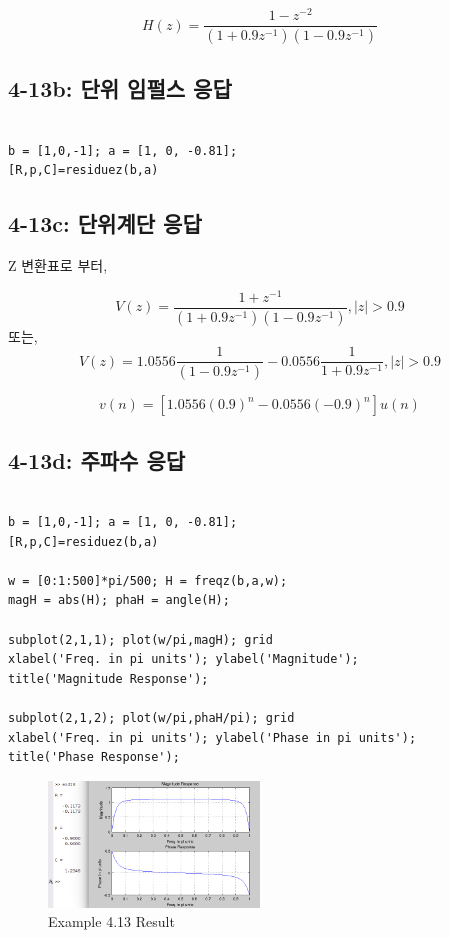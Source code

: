 \documentclass[11pt
  , a4paper
  , article
  , oneside
]{memoir}
\begin{document}
\begin {equation}
H(z) = \frac{1-z^{-2}}{(1+0.9z^{-1})(1-0.9z^{-1})}
\end {equation}

\subsection{4-13b: 단위 임펄스 응답}
\begin{lstlisting}[style=termstyle]
%Example 4.13

b = [1,0,-1]; a = [1, 0, -0.81];
[R,p,C]=residuez(b,a)

\end{lstlisting}


\subsection{4-13c: 단위계단 응답}
Z 변환표로 부터,

\begin {equation}
V(z) = \frac{1+z^{-1}}{(1+0.9z^{-1})(1-0.9z^{-1})}, |z| > 0.9
\end {equation}
또는,
\begin {equation}
V(z) = 1.0556\frac{1}{(1-0.9z^{-1})} - 0.0556\frac{1}{1+0.9z^{-1}}, |z| > 0.9
\end {equation}

\begin {equation}
v(n) = [1.0556(0.9)^n - 0.0556(-0.9)^n]u(n)
\end {equation}

\subsection{4-13d: 주파수 응답}
\begin{lstlisting}[style=termstyle]
%Example 4.13

b = [1,0,-1]; a = [1, 0, -0.81];
[R,p,C]=residuez(b,a)

w = [0:1:500]*pi/500; H = freqz(b,a,w);
magH = abs(H); phaH = angle(H);

subplot(2,1,1); plot(w/pi,magH); grid
xlabel('Freq. in pi units'); ylabel('Magnitude');
title('Magnitude Response');

subplot(2,1,2); plot(w/pi,phaH/pi); grid
xlabel('Freq. in pi units'); ylabel('Phase in pi units');
title('Phase Response');
\end{lstlisting}
\begin{figure}[h!]
	\centering
	\includegraphics[width=0.5\textwidth,height=0.3\textwidth]{./images/ex413.png}
	\caption{Example 4.13 Result}
	\label{fig:Example 4.13 Result}
\end{figure}
\end{document}
